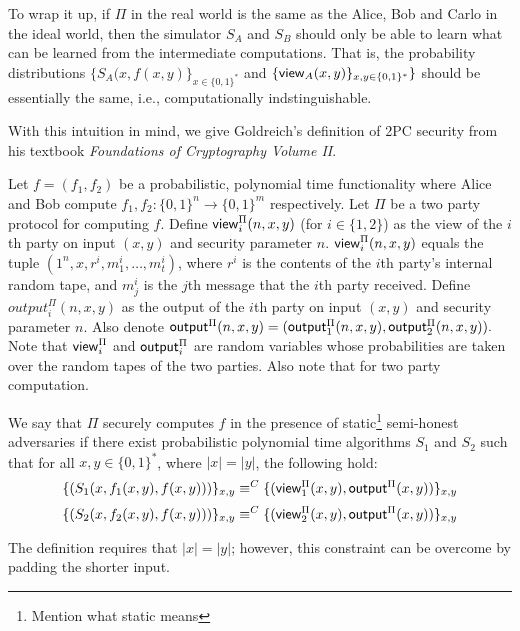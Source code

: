 To wrap it up, if $\Pi$ in the real world is the same as the Alice, Bob and Carlo in the ideal world, then the simulator $S_A$ and $S_B$ should only be able to learn what can be learned from the intermediate computations. 
That is, the probability distributions $\{S_A(x, f(x,y)\}_{x \in \{0,1\}^*}$ and $\{{\sf view}_A(x, y)\}_{x, y \in \{0,1\}^*}\}$ should be essentially the same, i.e., computationally indstinguishable.

With this intuition in mind, we give Goldreich's definition of 2PC security from his textbook \textit{Foundations of Cryptography Volume II}\cite{goldreich}.

\begin{definition}
Let $f = (f_1, f_2)$ be a probabilistic, polynomial time functionality where Alice and Bob compute $f_1, f_2: \{0,1\}^n \to \{0,1\}^m$ respectively.
Let $\Pi$ be a two party protocol for computing $f$. 
Define ${\sf view}_i^{\Pi}(n,x,y)$ (for $i \in \{1,2\}$) as the view of the $i$th party on input $(x,y)$ and security parameter $n$.
${\sf view}_i^{\Pi}(n,x,y)$ equals the tuple $(1^n, x, r^i, m_1^i, \ldots, m_t^i)$, where $r^i$ is the contents of the $i$th party's internal random tape, and $m_j^i$ is the $j$th message that the $i$th party received.
Define $output^{\Pi}_i(n,x,y)$ as the output of the $i$th party on input $(x,y)$ and security parameter $n$.
Also denote $ {\sf output}^{\Pi}(n,x,y) = ({\sf output}^{\Pi}_1(n,x,y), {\sf output}^{\Pi}_2(n,x,y)).$
Note that ${\sf view}^{\Pi}_i$ and ${\sf output}^{\Pi}_i$ are random variables whose probabilities are taken over the random tapes of the two parties. Also note that for two party computation.

We say that $\Pi$ securely computes $f$ in the presence of static\footnote{ Mention what static means} semi-honest adversaries if there exist probabilistic polynomial time algorithms $S_1$ and $S_2$ such that for all $x,y \in \{0,1\}^*$, where $|x| = |y|$, the following hold:
\begin{equation} 
    \label{eqn:secdef1}
    \{(S_1(x, f_1(x,y), f(x,y)))\}_{x,y} \equiv^C \{({\sf view}^{\Pi}_1(x,y), {\sf output}^{\Pi}(x,y)) \}_{x,y} 
\end{equation}
\begin{equation} 
    \label{eqn:secdef2}
    \{(S_2(x, f_2(x,y), f(x,y)))\}_{x,y} \equiv^C \{({\sf view}^{\Pi}_2(x,y), {\sf output}^{\Pi}(x,y)) \}_{x,y} 
\end{equation}
\end{definition}

The definition requires that $|x| = |y|$; however, this constraint can be overcome by padding the shorter input.

